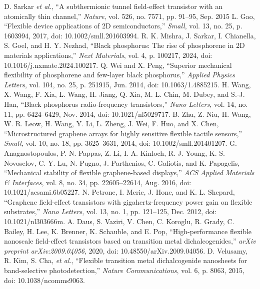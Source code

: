 \documentclass[conference]{IEEEtran}
\begin{document}
\begin{thebibliography}{00}
 D. Sarkar \textit{et al}., ``A subthermionic tunnel field-effect transistor with an atomically thin channel,'' \textit{Nature}, vol. 526, no. 7571, pp. 91–95, Sep. 2015
 L. Gao, ``Flexible device applications of 2D semiconductors,'' \textit{Small}, vol. 13, no. 25, p. 1603994, 2017, doi: 10.1002/smll.201603994.
 R. K. Mishra, J. Sarkar, I. Chianella, S. Goel, and H. Y. Nezhad, ``Black phosphorus: The rise of phosphorene in 2D materials applications,'' \textit{Next Materials}, vol. 4, p. 100217, 2024, doi: 10.1016/j.nxmate.2024.100217.
 Q. Wei and X. Peng, ``Superior mechanical flexibility of phosphorene and few-layer black phosphorus,'' \textit{Applied Physics Letters}, vol. 104, no. 25, p. 251915, Jun. 2014, doi: 10.1063/1.4885215.
 H. Wang, X. Wang, F. Xia, L. Wang, H. Jiang, Q. Xia, M. L. Chin, M. Dubey, and S.-J. Han, ``Black phosphorus radio-frequency transistors,'' \textit{Nano Letters}, vol. 14, no. 11, pp. 6424–6429, Nov. 2014, doi: 10.1021/nl5029717.
 B. Zhu, Z. Niu, H. Wang, W. R. Leow, H. Wang, Y. Li, L. Zheng, J. Wei, F. Huo, and X. Chen, ``Microstructured graphene arrays for highly sensitive flexible tactile sensors,'' \textit{Small}, vol. 10, no. 18, pp. 3625–3631, 2014, doi: 10.1002/smll.201401207.
 G. Anagnostopoulos, P. N. Pappas, Z. Li, I. A. Kinloch, R. J. Young, K. S. Novoselov, C. Y. Lu, N. Pugno, J. Parthenios, C. Galiotis, and K. Papagelis, ``Mechanical stability of flexible graphene-based displays,'' \textit{ACS Applied Materials \& Interfaces}, vol. 8, no. 34, pp. 22605–22614, Aug. 2016, doi: 10.1021/acsami.6b05227.
 N. Petrone, I. Meric, J. Hone, and K. L. Shepard, ``Graphene field-effect transistors with gigahertz-frequency power gain on flexible substrates,'' \textit{Nano Letters}, vol. 13, no. 1, pp. 121–125, Dec. 2012, doi: 10.1021/nl303666m.
 A. Daus, S. Vaziri, V. Chen, C. Koroglu, R. Grady, C. Bailey, H. Lee, K. Brenner, K. Schauble, and E. Pop, ``High-performance flexible nanoscale field-effect transistors based on transition metal dichalcogenides,'' \textit{arXiv preprint arXiv:2009.04056}, 2020, doi: 10.48550/arXiv.2009.04056.
 D. Velusamy, R. Kim, S. Cha, \textit{et al}., ``Flexible transition metal dichalcogenide nanosheets for band-selective photodetection,'' \textit{Nature Communications}, vol. 6, p. 8063, 2015, doi: 10.1038/ncomms9063.
\end{thebibliography}
\end{document}
